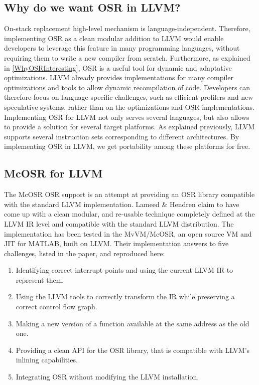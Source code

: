 \subsection{Why do we want OSR in LLVM?}

On-stack replacement high-level mechanism is language-independent.
Therefore, implementing OSR as a clean modular addition to LLVM would enable developers to leverage this feature in many programming languages, without requiring them to write a new compiler from scratch.
Furthermore, as explained in \ref{WhyOSRInteresting}, OSR is a useful tool for dynamic and adaptative optimizations.
LLVM already provides implementations for many compiler optimizations\cite{llvmUrl} and tools to allow dynamic recompilation of code.
Developers can therefore focus on language specific challenges, such as efficient profilers and new speculative systems, rather than on the optimizations and OSR implementations.\\

Implementing OSR for LLVM not only serves several languages, but also allows to provide a solution for several target platforms.
As explained previously, LLVM supports several instruction sets corresponding to different architectures.
By implementing OSR in LLVM, we get portability among these platforms for free.\\

\subsection{McOSR for LLVM}\label{McOSR}
The McOSR OSR support\cite{lameed2013modular} is an attempt at providing an OSR library compatible with the standard LLVM implementation. 
Lameed \& Hendren claim to have come up with a clean modular, and re-usable technique completely defined at the LLVM IR level and compatible with the standard LLVM distribution.
The implementation has been tested in the MvVM/McOSR\cite{chevalier2010optimizing, McVM}, an open source VM and JIT for MATLAB, built on LLVM.
Their implementation answers to five challenges, listed in the paper\cite{lameed2013modular}, and reproduced here:\\ 

\begin{enumerate}
    \item Identifying correct interrupt points and using the current LLVM IR to represent them.
    \item Using the LLVM tools to correctly transform the IR while preserving a correct control flow graph. 
    \item Making a new version of a function available at the same address as the old one.
    \item Providing a clean API for the OSR library, that is compatible with LLVM's inlining capabilities.
    \item Integrating OSR without modifying the LLVM installation.
\end{enumerate}

